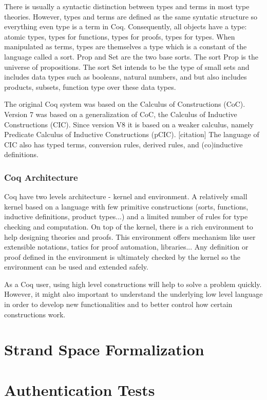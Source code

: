 There is usually a syntactic distinction between types and terms in
most type theories. However, types and terms are defined as the same
syntatic structure so everything even type is a term in
Coq. Consequently, all objects have a type:  atomic types, types for
functions, types for proofs, types for types. When manipulated as
terms, types are themselves a type which is a constant of the language
called a sort. Prop and Set are the two base sorts. The sort Prop is
the universe of propositions. The sort Set intends to be the type of
small sets and includes data types such as booleans, natural numbers,
and but also includes products, subsets, function type over these data
types.

The original Coq system was based on the Calculus of Constructions
(CoC). %
Version 7 was based on a generalization of CoC, the Calculus of Inductive
Constructions (CIC). %
Since version V8 it is based on a weaker calculus, namely Predicate
Calculus of Inductive Constructions (pCIC). %
[citation] 
The language of CIC also has typed terms, conversion rules,
derived rules, and (co)inductive definitions.

\subsection{Coq Architecture}
Coq have two levels architecture - kernel and environment. A relatively small kernel based on a language with few primitive constructions (sorts, functions, inductive definitions, product types...) and a limited number of rules for type checking and computation. On top of the kernel, there is a rich environment to help designing theories and proofs. This environment offers mechanism like user extensible notations, tatics for proof automation, libraries... Any definition or proof defined in the environment is ultimately checked by the kernel so the environment can be used and extended safely.

As a Coq user, using high level constructions will help to solve a problem quickly. However, it might also important to understand the underlying low level language in order to develop new functionalities and to better control how certain constructions work. 
 
\chapter{Strand Space Formalization}


\chapter{Authentication Tests}

